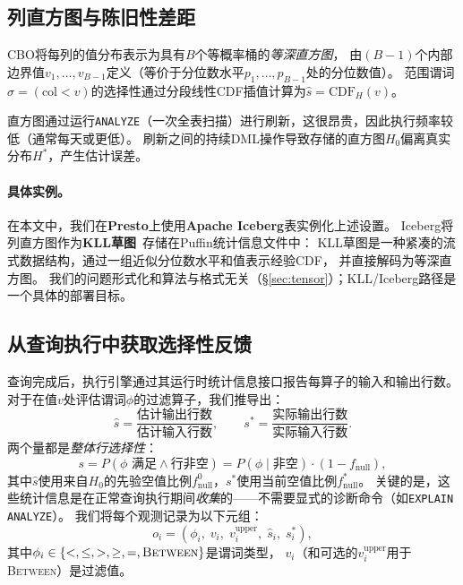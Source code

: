 \documentclass[runningheads]{llncs}
\begin{document}
\subsection{列直方图与陈旧性差距}

CBO将每列的值分布表示为具有$B$个等概率桶的\emph{等深直方图}，
由$(B-1)$个内部边界值$v_1,\ldots,v_{B-1}$定义（等价于分位数水平$p_1,\ldots,p_{B-1}$处的分位数值）。
范围谓词$\sigma=(\text{col} < v)$的选择性通过分段线性CDF插值计算为$\hat{s} = \mathrm{CDF}_{H}(v)$。

直方图通过运行\texttt{ANALYZE}（一次全表扫描）进行刷新，这很昂贵，因此执行频率较低（通常每天或更低）。
刷新之间的持续DML操作导致存储的直方图$H_0$偏离真实分布$H^*$，产生估计误差。

\paragraph{具体实例。}
在本文中，我们在\textbf{Presto}上使用\textbf{Apache Iceberg}表实例化上述设置。
Iceberg将列直方图作为\textbf{KLL草图}~\cite{ivkin2019kll}存储在Puffin统计信息文件中：
KLL草图是一种紧凑的流式数据结构，通过一组近似分位数水平和值表示经验CDF，
并直接解码为等深直方图。
我们的问题形式化和算法与格式无关（\S\ref{sec:tensor}）；KLL/Iceberg路径是一个具体的部署目标。

\subsection{从查询执行中获取选择性反馈}

查询完成后，执行引擎通过其运行时统计信息接口报告每算子的输入和输出行数。
对于在值$v$处评估谓词$\phi$的过滤算子，我们推导出：
\[
  \hat{s} = \frac{\text{估计输出行数}}{\text{估计输入行数}}, \qquad
  s^* = \frac{\text{实际输出行数}}{\text{实际输入行数}}.
\]
两个量都是\emph{整体行选择性}：
\begin{equation}
  s = P(\phi\text{ 满足} \wedge \text{行非空})
    = P(\phi \mid \text{非空}) \cdot (1 - f_{\text{null}}),
  \label{eq:sel_def}
\end{equation}
其中$\hat{s}$使用来自$H_0$的先验空值比例$f_{\text{null}}^0$，$s^*$使用当前空值比例$f_{\text{null}}^*$。
关键的是，这些统计信息是在正常查询执行期间\emph{收集}的——不需要显式的诊断命令（如\texttt{EXPLAIN ANALYZE}）。
我们将每个观测记录为以下元组：
\[
  o_i = (\phi_i,\; v_i,\; v_i^{\text{upper}},\;
         \hat{s}_i,\; s^*_i),
\]
其中$\phi_i \in
\{<, \leq, >, \geq, =, \textsc{Between}\}$是谓词类型，
$v_i$（和可选的$v_i^{\text{upper}}$用于\textsc{Between}）是过滤值。
\end{document}
